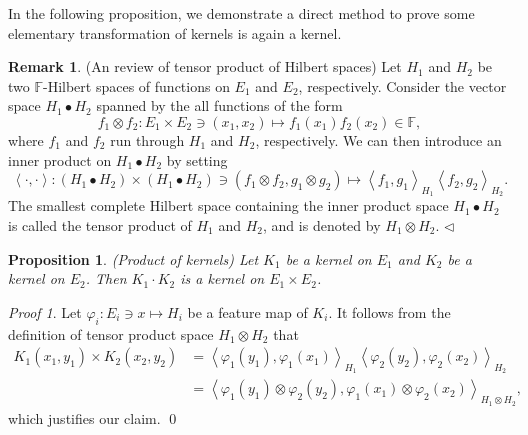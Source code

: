 \documentclass[a4paper,12pt]{article}
\newtheorem{prp}[thm]{Proposition}
\theoremstyle{remark}
\newtheorem*{prf}{Proof}
\theoremstyle{definition}
\newtheorem{rem}[thm]{Remark}
\theoremstyle{definition}
\theoremstyle{definition}
\newcommand{\ip}[2]{\left<#1, #2 \right>}
\newcommand{\fin}{\hfill \( \triangleleft \) }
\begin{document}
In the following proposition, we demonstrate a direct method to prove some elementary transformation of kernels is again a kernel.
\begin{rem} (An review of tensor product of Hilbert spaces)
	Let \( H_1 \) and \( H_2 \) be two \( \mathbb{F} \)-Hilbert spaces of functions on \( E_1 \) and \( E_2 \), respectively. Consider the vector space \( H_1 \bullet H_2 \) spanned by the all functions of the form
	\begin{equation*}
		f_1 \otimes f_2: E_1 \times E_2 \ni (x_1,x_2) \mapsto f_1(x_1)f_2(x_2) \in \mathbb{F},
	\end{equation*}
	where \( f_1 \) and \( f_2 \) run through \( H_1 \) and \( H_2 \), respectively.
	We can then introduce an inner product on \( H_1 \bullet H_2 \) by setting
	\begin{equation*}
		\ip{\cdot }{\cdot } : \left( H_1 \bullet H_2 \right) \times \left( H_1 \bullet H_2 \right) \ni (f_1 \otimes f_2, g_1 \otimes  g_2) \mapsto \ip{f_1}{g_1}_{H_1} \ip{f_2}{g_2}_{H_2}.
	\end{equation*}
	The smallest complete Hilbert space containing the inner product space \( H_1 \bullet H_2 \) is called the tensor product of \( H_1 \) and \( H_2 \), and is denoted by \( H_1 \otimes H_2 \).
	\fin\end{rem}
\begin{prp} (Product of kernels)
	Let \( K_1 \) be a kernel on \( E_1 \) and \( K_2 \) be a kernel on \( E_2 \). Then \( K_1 \cdot K_2 \) is a kernel on \( E_1 \times E_2 \).
\end{prp}
\begin{prf}
	Let \( \varphi_i : E_i \ni x \mapsto H_i \) be a feature map of \( K_i \). It follows from the definition of tensor product space \( H_1 \otimes H_2 \) that
	\begin{equation*}
		\begin{aligned}
			K_1(x_1,y_1) \times K_2(x_2,y_2)
			 & = \ip{\varphi_1(y_1)}{\varphi_1(x_1)}_{H_1} \ip{\varphi_2(y_2)}{\varphi_2(x_2)}_{H_2}                  \\
			 & = \ip{\varphi_1(y_1) \otimes \varphi_2(y_2)}{\varphi_1(x_1) \otimes \varphi_2(x_2)}_{H_1 \otimes H_2},
		\end{aligned}
	\end{equation*}
	which justifies our claim.
	\qed\end{prf}
\end{document}
